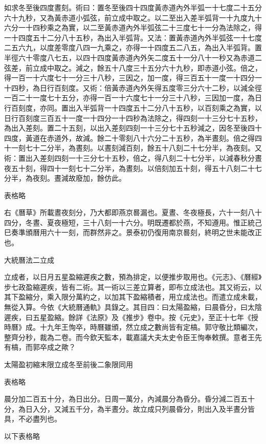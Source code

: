 如求冬至後四度晝刻。術曰：置冬至後四十四度黃赤道內外半弧一十七度二十五分六十九秒，又為黃赤道小弧弦，前立成中取之。以二至出入差半弧背一十九度九十六分一十四秒乘之為實，以二至黃赤道內外半弧弦二十三度七十一分為法除之，得一十四度五十二分八十五秒，為出入半弧背。又法：置黃赤道內外半弧弦一十七度二五六九，以度差零度八四一九乘之，亦得一十四度五二八五，為出入半弧背。置半徑六十零度八七五，以四十四度黃赤道內外矢二度五十一分八十一秒又為赤道二弦差，前立成中取之。減之，餘五十八度三十五分六十九秒，即赤道小弦。倍之，得一百一十六度七十一分三十八秒，三因之，加一度，得三百五十一度一十四分一十四秒，為日行百刻度。又術：倍黃赤道內外矢得五度零三分六十二秒，以減全徑一百二十一度七十五分，亦得一百一十六度七十一分三十八秒，三因加一度，為日行百刻度，亦同。置出入半弧背一十四度五十二分八十五秒，以百刻乘之為實，以日行百刻度三百五十一度一十四分一十四秒為法除之，得四刻一十三分七十五秒，為出入差刻。置二十五刻，以出入差刻四刻一十三分七十五秒減之，因冬至後四十四度，黃道在赤道外，故減。餘二十零刻八十六分二十五秒，為半晝刻。倍之得四十一刻七十二分半，為晝刻。以晝刻減百刻，餘五十八刻二十七分半，為夜刻。又術：置出入差刻四刻一十三分七十五秒，倍之，得八刻二十七分半，以減春秋分晝夜五十刻，得四十一刻七十二分半，為晝刻。以倍刻加五十刻，得五十八刻二十七分半，為夜刻。晝減故廢加，餘仿此。

表格略

右《曆草》所載晝夜刻分，乃大都即燕京晷漏也。夏晝、冬夜極長，六十一刻八十四分，冬晝、夏夜極短，三十八刻一十六分。明既遷都於燕，不知遵用。惟正統己巳奏準頒曆用六十一刻，而群然非之。景泰初仍復用南京晷刻，終明之世未能改正也。


大統曆法二立成

立成者，以日月五星盈縮遲疾之數，預為排定，以便推步取用也。《元志》、《曆經》步七政盈縮遲疾，皆有二術。其一術以三差立算者，即布立成法也。其又術云，以其下盈縮分，乘入限分萬約之，以加其下盈縮積者，用立成法也。而遣立成未載，無從入算。今依《大統曆通軌》具錄之。其目四：曰太陽盈縮，曰晨昏分，曰太陰遲疾，曰五星盈縮。餘詳《法原》及《推步》卷中。按《元史》，至正十七年《授時曆》成。十九年王恂卒，時曆雖頒，然立成之數尚皆有定槁。郭守敬比類編次，整齊分秒，裁為二卷。而今欽天監本，載嘉議大夫太史令臣王恂奉敕撰。意者王先有槁，而郭卒成之歟？

太陽盈初縮末限立成冬至前後二象限同用

表格略

晨分加二百五十分，為日出分。日周一萬分，內減晨分為昏分。昏分減二百五十分，為日入分，又減五千分，為半晝分。故立成只列晨昏分，則出入及半晝分皆具，不必盡列也。

以下表格略


